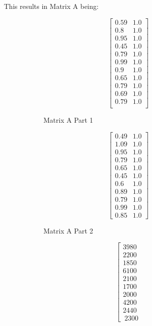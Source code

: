 \documentclass[letterpaper, conference]{IEEEtran}
\begin{document}
	This results in Matrix A being:
	\begin{figure}
		\centering
		\begin{subfigure}{0.2\textwidth}
			\centering
				\[
				\left[
				\begin{matrix}
				0.59 & 1.0\\
				0.8 & 1.0\\
				0.95 & 1.0\\
				0.45 & 1.0\\
				0.79 & 1.0\\
				0.99 & 1.0\\
				0.9 & 1.0\\
				0.65 & 1.0\\
				0.79 & 1.0\\
				0.69 & 1.0\\
				0.79 & 1.0\\
				\end{matrix}\right]
				\]
				\caption{Matrix A Part 1}
		\end{subfigure}
		\begin{subfigure}{0.2\textwidth}
			\centering
			\[\left[
			\begin{matrix}
			0.49 & 1.0\\
			1.09 & 1.0\\
			0.95 & 1.0\\
			0.79 & 1.0\\
			0.65 & 1.0\\
			0.45 & 1.0\\
			0.6 & 1.0\\
			0.89 & 1.0\\
			0.79 & 1.0\\
			0.99 & 1.0\\
			0.85 & 1.0
			\end{matrix}
			\right]
			\]
			\caption{Matrix A Part 2}
		\end{subfigure}
		\begin{subfigure}{0.2\textwidth}
			\centering 
			\[\left[
			\begin{matrix}
			3980 \\
			2200 \\
			1850 \\
			6100 \\
			2100 \\
			1700 \\
			2000 \\
			4200 \\
			2440 \\
\
			2300 
			\end{matrix}
\]
\end{subfigure}
\end{figure}
\end{document}

